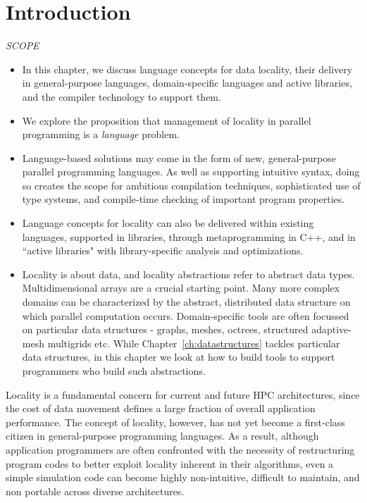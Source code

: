 \section{Introduction}

{\it
SCOPE
  \begin{itemize}
  \item In this chapter, we discuss language concepts for data locality, their delivery in general-purpose languages, domain-specific languages and active libraries, and the compiler technology to support them.
  \item We explore the proposition that management of locality in parallel programming is a \emph{language} problem.
  \item Language-based solutions may come in the form of new, general-purpose parallel programming languages.  As well as supporting intuitive syntax, doing so creates the scope for ambitious compilation techniques, sophisticated use of type systems, and compile-time checking of important program properties.  
  \item Language concepts for locality can also be delivered within existing languages, supported in libraries, through metaprogramming in C++, and in ``active libraries" with library-specific analysis and optimizations.
  \item Locality is about data, and locality abstractions refer to abstract data types.  Multidimensional arrays are a crucial starting point.  Many more complex domains can be characterized by the abstract, distributed data structure on which parallel computation occurs.  Domain-specific tools are often focussed on particular data structures - graphs, meshes, octrees, structured adaptive-mesh multigrids etc.  While Chapter~\ref{ch:datastructures} tackles particular data structures, in this chapter we look at how to build tools to support programmers who build such abstractions.
  \end{itemize}
}

Locality is a fundamental concern for current and future HPC architectures, since the cost of data movement defines a large fraction of overall application performance. The concept of locality, however, has not yet become a first-class citizen in general-purpose programming languages. As a result, although application programmers are often confronted with the necessity of restructuring program codes to better exploit locality inherent in their algorithms, even a simple simulation code can become highly non-intuitive, difficult to maintain, and non portable across diverse architectures. 

